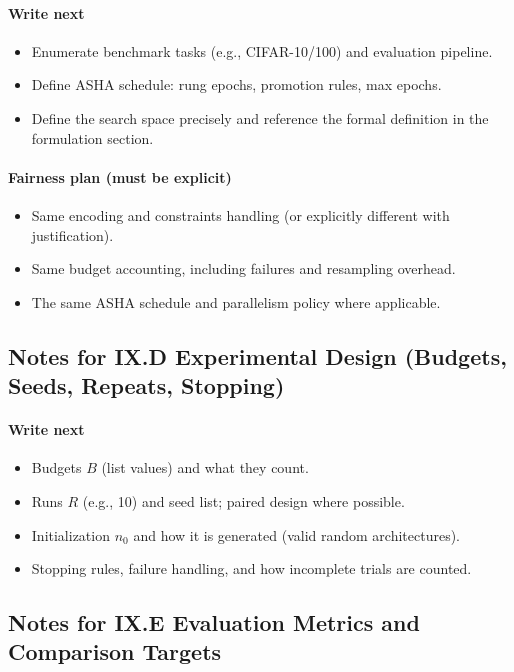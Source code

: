 \paragraph{Write next}
\begin{itemize}
  \item Enumerate benchmark tasks (e.g., CIFAR-10/100) and evaluation pipeline.
  \item Define ASHA schedule: rung epochs, promotion rules, max epochs.
  \item Define the search space precisely and reference the formal definition in the formulation section.
\end{itemize}


\paragraph{Fairness plan (must be explicit)}
\begin{itemize}
  \item Same encoding and constraints handling (or explicitly different with justification).
  \item Same budget accounting, including failures and resampling overhead.
  \item The same ASHA schedule and parallelism policy where applicable.
\end{itemize}

\subsection*{Notes for IX.D Experimental Design (Budgets, Seeds, Repeats, Stopping)}
\paragraph{Write next}
\begin{itemize}
  \item Budgets $B$ (list values) and what they count.
  \item Runs $R$ (e.g., 10) and seed list; paired design where possible.
  \item Initialization $n_0$ and how it is generated (valid random architectures).
  \item Stopping rules, failure handling, and how incomplete trials are counted.
\end{itemize}

\subsection*{Notes for IX.E Evaluation Metrics and Comparison Targets}
